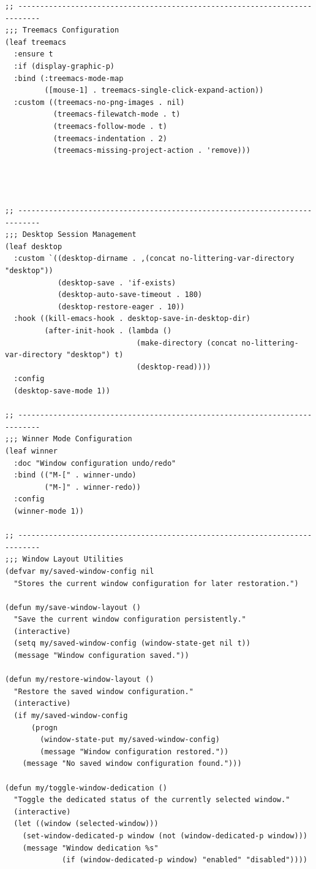 \documentclass[11pt]{article}
\begin{document}
\begin{verbatim}
;; ---------------------------------------------------------------------------
;;; Treemacs Configuration
(leaf treemacs
  :ensure t
  :if (display-graphic-p)
  :bind (:treemacs-mode-map
         ([mouse-1] . treemacs-single-click-expand-action))
  :custom ((treemacs-no-png-images . nil)
           (treemacs-filewatch-mode . t)
           (treemacs-follow-mode . t)
           (treemacs-indentation . 2)
           (treemacs-missing-project-action . 'remove)))




;; ---------------------------------------------------------------------------
;;; Desktop Session Management
(leaf desktop
  :custom `((desktop-dirname . ,(concat no-littering-var-directory "desktop"))
            (desktop-save . 'if-exists)
            (desktop-auto-save-timeout . 180)
            (desktop-restore-eager . 10))
  :hook ((kill-emacs-hook . desktop-save-in-desktop-dir)
         (after-init-hook . (lambda ()
                              (make-directory (concat no-littering-var-directory "desktop") t)
                              (desktop-read))))
  :config
  (desktop-save-mode 1))

;; ---------------------------------------------------------------------------
;;; Winner Mode Configuration
(leaf winner
  :doc "Window configuration undo/redo"
  :bind (("M-[" . winner-undo)
         ("M-]" . winner-redo))
  :config
  (winner-mode 1))

;; ---------------------------------------------------------------------------
;;; Window Layout Utilities
(defvar my/saved-window-config nil
  "Stores the current window configuration for later restoration.")

(defun my/save-window-layout ()
  "Save the current window configuration persistently."
  (interactive)
  (setq my/saved-window-config (window-state-get nil t))
  (message "Window configuration saved."))

(defun my/restore-window-layout ()
  "Restore the saved window configuration."
  (interactive)
  (if my/saved-window-config
      (progn
        (window-state-put my/saved-window-config)
        (message "Window configuration restored."))
    (message "No saved window configuration found.")))

(defun my/toggle-window-dedication ()
  "Toggle the dedicated status of the currently selected window."
  (interactive)
  (let ((window (selected-window)))
    (set-window-dedicated-p window (not (window-dedicated-p window)))
    (message "Window dedication %s"
             (if (window-dedicated-p window) "enabled" "disabled"))))
\end{verbatim}
\end{document}
